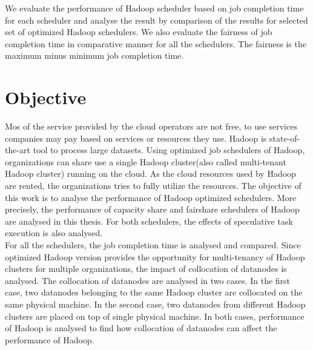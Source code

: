 We evaluate the performance of Hadoop scheduler based on job completion time for each scheduler and analyse the result by comparison of the results for selected set of optimized Hadoop schedulers. We also evaluate the fairness of job completion time in comparative manner for all the schedulers. The fairness is the maximum minus minimum job completion time. \\
 




\section{Objective}

  Mos of the service provided by the cloud operators are not free, to use services companies may pay based on services or resources they use. Hadoop is state-of-the-art tool to process large datasets. Using optimized job schedulers of Hadoop, organizations can share use a single Hadoop cluster(also called multi-tenant Hadoop cluster) running on the cloud. As the cloud resources used by Hadoop are rented, the organizations tries to fully utilize the resources. The objective of this work is to analyse the performance of Hadoop optimized schedulers. More precisely, the performance of capacity share and fairshare schedulers of Hadoop are analysed in this thesis. For both schedulers, the effects of speculative task execution is also analysed.\\
 
 For all the schedulers, the job completion time is analysed and compared. Since optimized Hadoop version provides the  opportunity for multi-tenancy of Hadoop clusters for multiple organizations, the impact of collocation of datanodes is analysed. The collocation of datanodes are analysed in two cases. In the first case, two datanodes belonging to the same Hadoop cluster are collocated on the same physical machine. In the second case, two datanodes from different Hadoop clusters are placed on top of single physical machine. In both cases, performance of Hadoop is analysed to find how collocation of datanodes can affect the performance of Hadoop. \\  
 



